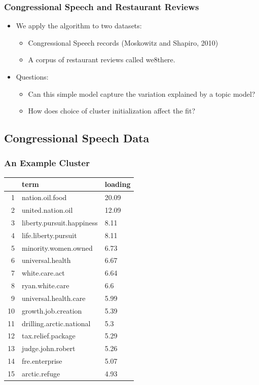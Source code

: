 \documentclass{beamer}
\begin{document}
\begin{frame}
\frametitle{Congressional Speech and Restaurant Reviews}
\begin{itemize}
\item<+-> We apply the algorithm to two datasets:
	\begin{itemize} 
	\item Congressional Speech records (Moskowitz and Shapiro, 2010) 
	\item A corpus of restaurant reviews called we8there.
	\end{itemize}
\item<+-> Questions:
	\begin{itemize}
	\item Can this simple model capture the variation explained by a topic model?
	\item How does choice of cluster initialization affect the fit? 
	\end{itemize}
\end{itemize}
\end{frame}


\subsection{Congressional Speech Data}

\begin{frame}
\frametitle{An Example Cluster}
\begin{center}
\small
\begin{tabular}{rll}
  \hline
 & term & loading \\ 
  \hline
1 & nation.oil.food & 20.09 \\ 
  2 & united.nation.oil & 12.09 \\ 
  3 & liberty.pursuit.happiness & 8.11 \\ 
  4 & life.liberty.pursuit & 8.11 \\ 
  5 & minority.women.owned & 6.73 \\ 
  6 & universal.health & 6.67 \\ 
  7 & white.care.act & 6.64 \\ 
  8 & ryan.white.care & 6.6 \\ 
  9 & universal.health.care & 5.99 \\ 
  10 & growth.job.creation & 5.39 \\ 
  11 & drilling.arctic.national & 5.3 \\ 
  12 & tax.relief.package & 5.29 \\ 
  13 & judge.john.robert & 5.26 \\ 
  14 & fre.enterprise & 5.07 \\ 
  15 & arctic.refuge & 4.93 \\ 
   \hline
\end{tabular}
\end{center}
\end{frame}
\end{document}
